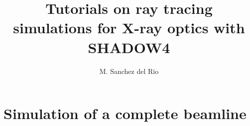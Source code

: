 \documentclass{ol-softwaremanual}
\title{Tutorials on ray tracing simulations for X-ray optics with SHADOW4}
\author{M. Sanchez del Rio}
\begin{document}
\maketitle

\tableofcontents


\newpage
\section{Simulation of a complete beamline}


\end{document}
